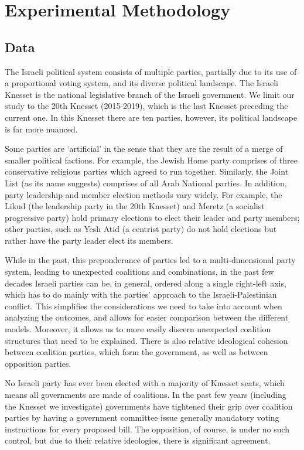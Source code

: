 
\chapter{Experimental Methodology}
\label{ch:experiment}

\section{Data}
\label{sec:data}

The Israeli political system consists of multiple parties, partially due to its use of
a proportional voting system, and its diverse political landscape.
The Israeli Knesset is the national legislative branch of the Israeli government.
We limit our study to the 20th Knesset (2015-2019), which is the last
Knesset preceding the current one.
In this Knesset there are ten parties, however, its political landscape is far more nuanced.

Some parties are `artificial' in the sense that they are the result of a merge
of smaller political factions.
For example, the Jewish Home party comprises of three conservative religious
parties which agreed to run together.
Similarly, the Joint List (as its name suggests) comprises of all Arab National
parties. 
In addition, party leadership and member election methods vary widely.
For example, the Likud (the leadership party in the 20th Knesset) and Meretz
(a socialist progressive party) hold primary elections to elect their leader
and party members; other parties, such as Yesh Atid (a centrist party) do not
hold elections but rather have the party leader elect its members. 

While in the past, this preponderance of parties led to a multi-dimensional
party system, leading to unexpected coalitions and combinations,
in the past few decades Israeli parties can be, in general,
ordered along a single right-left axis, which has to do mainly with
the parties' approach to the Israeli-Palestinian conflict.
This simplifies the considerations we need to take into account when analyzing
the outcomes, and allows for easier comparison between the different models.
Moreover, it allows us to more easily discern
unexpected coalition structures that need to be explained.
There is also relative ideological cohesion between coalition parties, which
form the government, as well as between opposition parties.

No Israeli party has ever been elected with a majority of Knesset seats,
which means all governments are made of coalitions.
In the past few years (including the Knesset we investigate)
governments have tightened their grip over coalition parties by having a government committee issue generally mandatory
voting instructions for every proposed bill.
The opposition, of course, is under no such control,
but due to their relative ideologies, there is significant agreement.

